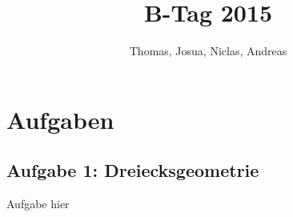 \documentclass[a4paper,11pt]{article}
\title{B-Tag 2015}
\author{Thomas, Josua, Niclas, Andreas}
\begin{document}
\maketitle
\tableofcontents

\section{Aufgaben}
\subsection{Aufgabe 1: Dreiecksgeometrie}
Aufgabe hier
\end{document}
